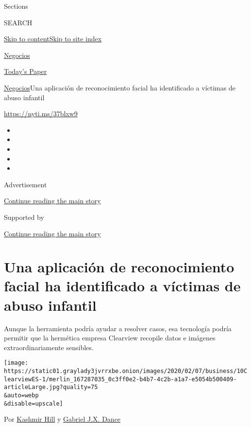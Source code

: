 Sections

SEARCH

\protect\hyperlink{site-content}{Skip to
content}\protect\hyperlink{site-index}{Skip to site index}

\href{https://www.nytimes3xbfgragh.onion/es/section/negocios}{Negocios}

\href{https://myaccount.nytimes3xbfgragh.onion/auth/login?response_type=cookie\&client_id=vi}{}

\href{https://www.nytimes3xbfgragh.onion/section/todayspaper}{Today's
Paper}

\href{/es/section/negocios}{Negocios}\textbar{}Una aplicación de
reconocimiento facial ha identificado a víctimas de abuso infantil

\href{https://nyti.ms/37blxw9}{https://nyti.ms/37blxw9}

\begin{itemize}
\item
\item
\item
\item
\item
\end{itemize}

Advertisement

\protect\hyperlink{after-top}{Continue reading the main story}

Supported by

\protect\hyperlink{after-sponsor}{Continue reading the main story}

\hypertarget{una-aplicaciuxf3n-de-reconocimiento-facial-ha-identificado-a-vuxedctimas-de-abuso-infantil}{%
\section{Una aplicación de reconocimiento facial ha identificado a
víctimas de abuso
infantil}\label{una-aplicaciuxf3n-de-reconocimiento-facial-ha-identificado-a-vuxedctimas-de-abuso-infantil}}

Aunque la herramienta podría ayudar a resolver casos, esa tecnología
podría permitir que la hermética empresa Clearview recopile datos e
imágenes extraordinariamente sensibles.

\texttt{[image: https://static01.graylady3jvrrxbe.onion/images/2020/02/07/business/10ClearviewES-1/merlin\_167287035\_0c3ff0e2-b4b7-4c2b-a1a7-e5054b500409-articleLarge.jpg?quality=75\\\&auto=webp\\\&disable=upscale]}

Por \href{https://www.nytimes3xbfgragh.onion/by/kashmir-hill}{Kashmir
Hill} y
\href{https://www.nytimes3xbfgragh.onion/by/gabriel-dance}{Gabriel J.X.
Dance}

